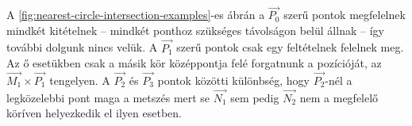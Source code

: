A \ref{fig:nearest-circle-intersection-examples}-es ábrán a $\overrightarrow{P_0}$ szerű pontok megfelelnek mindkét kitételnek -- mindkét ponthoz szükséges távolságon belül állnak -- így további dolgunk nincs velük. A $\overrightarrow{P_1}$ szerű pontok csak egy feltételnek felelnek meg. Az ő esetükben csak a másik kör középpontja felé forgatnunk a pozícióját, az $\overrightarrow{M_1} × \overrightarrow{P_1}$ tengelyen. A $\overrightarrow{P_2}$ és $\overrightarrow{P_3}$ pontok közötti különbség, hogy $\overrightarrow{P_2}$-nél a legközelebbi pont maga a metszés mert se $\overrightarrow{N_1}$ sem pedig $\overrightarrow{N_2}$ nem a megfelelő köríven helyezkedik el ilyen esetben.

\begin{figure}[h!]
	\centering
	\begin{tikzpicture}[x=0.75pt,y=0.75pt,yscale=-1,xscale=1]


\end{tikzpicture}
\end{figure}
